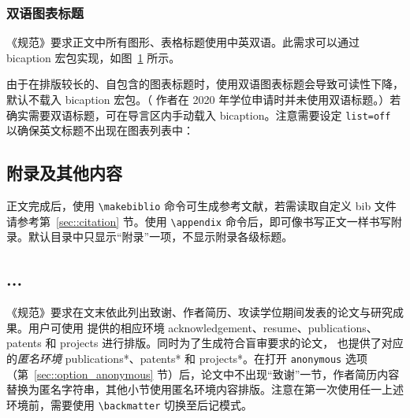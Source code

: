 \documentclass[master]{shtthesis}
\begin{document}
\subsection{双语图表标题}
《规范》要求正文中所有图形、表格标题使用中英双语。此需求可以通过 \textsf{bicaption} 宏包实现，如图~\ref{img::sht_logo} 所示。
\begin{figure}[htb]
  \centering
  \label{img::sht_logo}
\end{figure}

由于在排版较长的、自包含的图表标题时，使用双语图表标题会导致可读性下降，\shtthesis{} 默认不载入 \textsf{bicaption} 宏包。（ \shtthesis{} 作者在 2020 年学位申请时并未使用双语标题。）若确实需要双语标题，可在导言区内手动载入 \textsf{bicaption}。注意需要设定 \verb|list=off| 以确保英文标题不出现在图表列表中：
\begin{latex}
\usepackage[list=off]{bicaption}
\captionsetup[figure][bi-second]{name=Figure}
\captionsetup[table][bi-second]{name=Table}
\end{latex}

\section{附录及其他内容} \label{sec::backmatter}
正文完成后，使用 \verb|\makebiblio| 命令可生成参考文献，若需读取自定义 bib 文件请参考第~\ref{sec::citation} 节。使用 \verb|\appendix| 命令后，即可像书写正文一样书写附录。默认目录中只显示“附录”一项，不显示附录各级标题。
\begin{latex}
\appendix
\chapter{...}
\end{latex}

《规范》要求在文末依此列出致谢、作者简历、攻读学位期间发表的论文与研究成果。用户可使用 \shtthesis{} 提供的相应环境 acknowledgement、resume、publications、patents 和 projects 进行排版。同时为了生成符合盲审要求的论文，\shtthesis{} 也提供了对应的\emph{匿名环境} publications*、patents* 和 projects*。在打开 \verb|anonymous| 选项（第~\ref{sec::option_anonymous} 节）后，论文中不出现“致谢”一节，作者简历内容替换为匿名字符串，其他小节使用匿名环境内容排版。注意在第一次使用任一上述环境前，需要使用 \verb|\backmatter| 切换至后记模式。
\end{document}
